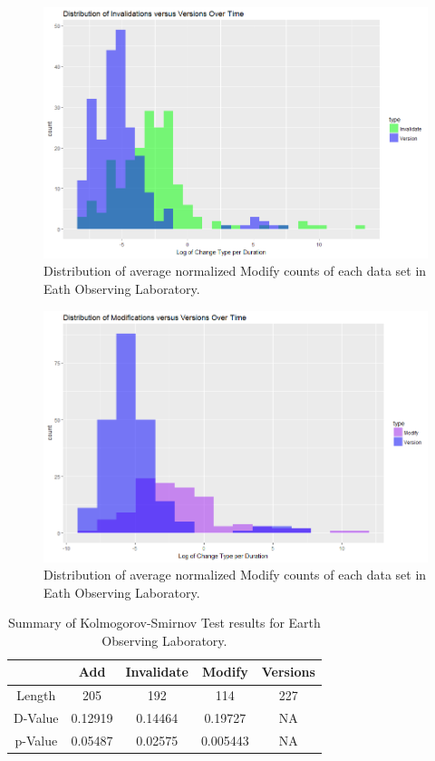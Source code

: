 \begin{figure}%
	\centering
	\includegraphics[scale=.6]{figures/Eol_Inv_Ver_Rate.png}
	\caption{Distribution of average normalized Modify counts of each data set in Eath Observing Laboratory.}
	\label{EOL_Inv_Ver}
\end{figure}

\begin{figure}%
	\centering
	\includegraphics[scale=.6]{figures/Eol_Mod_Ver_Rate.png}
	\caption{Distribution of average normalized Modify counts of each data set in Eath Observing Laboratory.}
	\label{EOL_Mod_Ver}
\end{figure}

\begin{table}
	\caption{Summary of Kolmogorov-Smirnov Test results for Earth Observing Laboratory.}
	\label{table:Eol_KS}
	\centering
	\begin{tabular}{|c|c|c|c|c|}
		\hline
		&	Add&	Invalidate&	Modify&	Versions\\ \hline
		Length&	205&	192&	114&	227\\
		D-Value&	0.12919&	0.14464&	0.19727&	NA\\
		p-Value&	0.05487&	0.02575&	0.005443&	NA\\
		\hline
	\end{tabular}
\end{table}